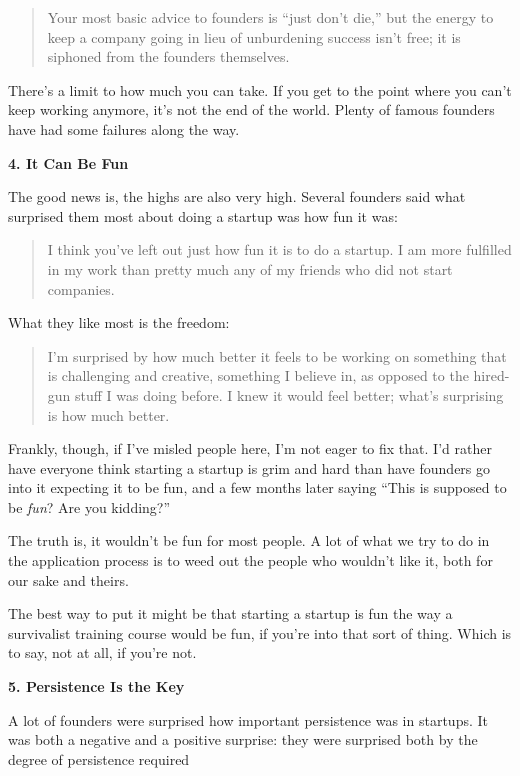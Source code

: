 \documentclass[12pt]{book}
\begin{document}
\begin{quote}
Your most basic advice to founders is ``just don't die,'' but the energy
to keep a company going in lieu of unburdening success isn't free; it is
siphoned from the founders themselves.
\end{quote}

There's a limit to how much you can take. If you get to the point where
you can't keep working anymore, it's not the end of the world. Plenty of
famous founders have had some failures along the way.

\textbf{4. It Can Be Fun}

The good news is, the highs are also very high. Several founders said
what surprised them most about doing a startup was how fun it was:

\begin{quote}
I think you've left out just how fun it is to do a startup. I am more
fulfilled in my work than pretty much any of my friends who did not
start companies.
\end{quote}

What they like most is the freedom:

\begin{quote}
I'm surprised by how much better it feels to be working on something
that is challenging and creative, something I believe in, as opposed to
the hired-gun stuff I was doing before. I knew it would feel better;
what's surprising is how much better.
\end{quote}

Frankly, though, if I've misled people here, I'm not eager to fix that.
I'd rather have everyone think starting a startup is grim and hard than
have founders go into it expecting it to be fun, and a few months later
saying ``This is supposed to be \emph{fun}? Are you kidding?''

The truth is, it wouldn't be fun for most people. A lot of what we try
to do in the application process is to weed out the people who wouldn't
like it, both for our sake and theirs.

The best way to put it might be that starting a startup is fun the way a
survivalist training course would be fun, if you're into that sort of
thing. Which is to say, not at all, if you're not.

\textbf{5. Persistence Is the Key}

A lot of founders were surprised how important persistence was in
startups. It was both a negative and a positive surprise: they were
surprised both by the degree of persistence required
\end{document}
